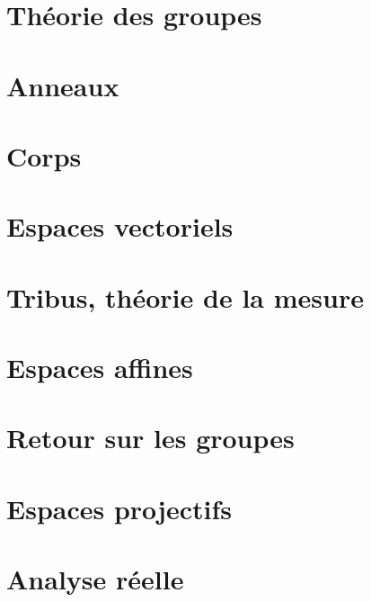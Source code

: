 \chapter{Théorie des groupes}



\chapter{Anneaux}


\chapter{Corps}






\chapter{Espaces vectoriels}








%
\chapter{Tribus, théorie de la mesure}





\chapter{Espaces affines}


\chapter{Retour sur les groupes}




\chapter{Espaces projectifs}


\chapter{Analyse réelle}







